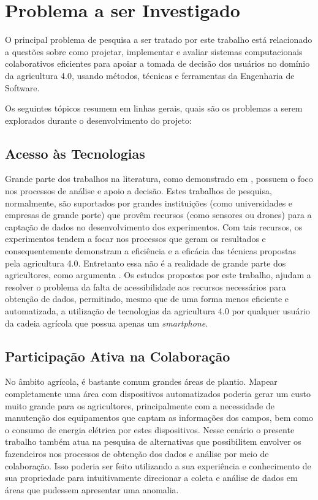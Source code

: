 \documentclass[12pt]{article}
\begin{document}
\section{Problema a ser Investigado}
\label{sec:problema_investigado}

O principal problema de pesquisa a ser tratado por este trabalho está relacionado a questões sobre como projetar, implementar e avaliar sistemas computacionais colaborativos eficientes para apoiar a tomada de decisão dos usuários no domínio da agricultura 4.0, usando métodos, técnicas e ferramentas da Engenharia de Software.

Os seguintes tópicos resumem em linhas gerais, quais são os problemas a serem explorados durante o desenvolvimento do projeto:

\subsection{Acesso às Tecnologias}
\label{subsec:acesso_tecnologias}

Grande parte dos trabalhos na literatura, como demonstrado em \cite{Massruha:2017}, possuem o foco nos processos de análise e apoio a decisão. Estes trabalhos de pesquisa, normalmente, são suportados por grandes instituições (como universidades e empresas de grande porte) que provêm recursos (como sensores ou drones) para a captação de dados no desenvolvimento dos experimentos. Com tais recursos, os experimentos tendem a focar nos processos que geram os resultados e consequentemente demonstram a eficiência e a eficácia das técnicas propostas pela agricultura 4.0. Entretanto essa não é a realidade de grande parte dos agricultores, como argumenta \cite{Rose:2019}. Os estudos propostos por este trabalho, ajudam a resolver o problema da falta de acessibilidade aos recursos necessários para obtenção de dados, permitindo, mesmo que de uma forma menos eficiente e automatizada, a utilização de tecnologias da agricultura 4.0 por qualquer usuário da cadeia agrícola que possua apenas um \textit{smartphone}.

\subsection{Participação Ativa na Colaboração}
\label{subsec:participacao_ativa_colaboracao}

No âmbito agrícola, é bastante comum grandes áreas de plantio. Mapear completamente uma área com dispositivos automatizados poderia gerar um custo muito grande para os agricultores, principalmente com a necessidade de manutenção dos equipamentos que captam as informações dos campos, bem como o consumo de energia elétrica por estes dispositivos. Nesse cenário o presente trabalho também atua na pesquisa de alternativas que possibilitem envolver os fazendeiros nos processos de obtenção dos dados e análise por meio de colaboração. Isso poderia ser feito utilizando a sua experiência e conhecimento de sua propriedade para intuitivamente direcionar a coleta e análise de dados em áreas que pudessem apresentar uma anomalia.
\end{document}

